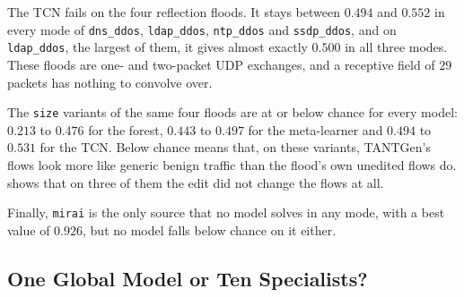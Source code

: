 The \ac{TCN} fails on the four reflection floods. It stays between $0.494$ and $0.552$
in every mode of \texttt{dns\_ddos}, \texttt{ldap\_ddos}, \texttt{ntp\_ddos} and
\texttt{ssdp\_ddos}, and on \texttt{ldap\_ddos}, the largest of them, it gives almost
exactly $0.500$ in all three modes. These floods are one- and two-packet UDP
exchanges, and a receptive field of $29$ packets has nothing to convolve over.

The \texttt{size} variants of the same four floods are at or below chance for every
model: $0.213$ to $0.476$ for the forest, $0.443$ to $0.497$ for the meta-learner and
$0.494$ to $0.531$ for the \ac{TCN}. Below chance means that, on these variants,
TANTGen's flows look more like generic benign traffic than the flood's own unedited
flows do.  shows that on three of them the edit did not
change the flows at all.

Finally, \texttt{mirai} is the only source that no model solves in any mode, with a best
value of $0.926$, but no model falls below chance on it either.

\subsection{One Global Model or Ten Specialists?}\label{subsec:eval-perattack}

